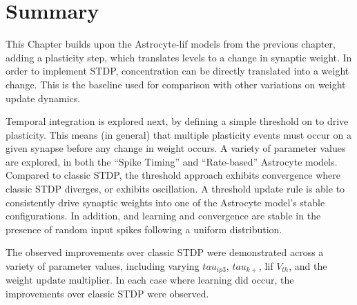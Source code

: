 
\section{Summary}

This Chapter builds upon the Astrocyte-\Gls{lif} models from the previous chapter,
adding a plasticity step, which translates \ca levels to a change
in synaptic weight. In order to implement STDP, \ca concentration can be directly
translated into a weight change. This is the baseline used for comparison with
other variations on weight update dynamics.

Temporal integration is explored next, by defining a simple threshold on
\ca to drive plasticity. This means (in general) that multiple plasticity events
must occur on a given synapse before any change in weight occurs. A variety of
parameter values are explored, in both the ``Spike Timing'' and ``Rate-based''
Astrocyte models. Compared to classic STDP, the threshold approach exhibits
convergence where classic STDP diverges, or exhibits oscillation. A threshold
update rule is able to consistently drive synaptic weights into one of the
Astrocyte model's stable configurations. In addition, and learning and
convergence are stable in the presence of random input spikes following a
uniform distribution.

The observed improvements over classic STDP were demonstrated across a variety
of parameter values, including varying $tau_{ip3}$, $tau_{k+}$, \Gls{lif} $V_{th}$,
and the weight update multiplier. In each case where learning did occur, the
improvements over classic STDP were observed.

